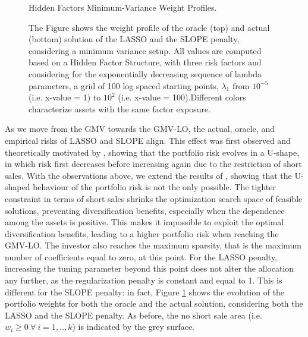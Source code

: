 \documentclass[12pt, a4paper]{article}
\begin{document}
%
\begin{figure}[h!]
\centering
\caption{Hidden Factors Minimum-Variance Weight Profiles.}\label{Weights_HiddenFactors_MinVar}
\captionsetup{font=scriptsize,labelfont=scriptsize, width=\textwidth}
     \caption*{The Figure shows the weight profile of the oracle (top) and actual (bottom) solution of the LASSO and the SLOPE penalty, considering a minimum variance setup. All values are computed based on a Hidden Factor Structure, with three risk factors and considering for the exponentially decreasing sequence of lambda parameters, a grid of 100 log spaced starting points, $\lambda_{1}$ from $10^{-5}$ (i.e. x-value = 1) to $10^{2}$ (i.e. x-value = 100).Different colors characterize assets with the same factor exposure.}
\end{figure}
%
\noindent
As we move from the GMV towards the GMV-LO, the actual, oracle, and empirical risks of LASSO and SLOPE align. This effect was first observed and theoretically motivated by \cite{Fan2012}, showing that the portfolio risk evolves in a U-shape, in which risk first decreases before increasing again due to the restriction of short sales. With the observations above, we extend the results of \cite{Fan2012}, showing that the U-shaped behaviour of the portfolio risk is not the only possible. The tighter constraint in terms of short sales shrinks the optimization search space of feasible solutions, preventing diversification benefits, especially when the dependence among the assets is positive. This makes it impossible to exploit the optimal diversification benefits, leading to a higher portfolio risk when reaching the GMV-LO. The investor also reaches the maximum sparsity, that is the maximum number of coefficients equal to zero, at this point. For the LASSO penalty, increasing the tuning parameter beyond this point does not alter the allocation any further, as the regularization penalty is constant and equal to 1. This is different for the SLOPE penalty: in fact, Figure \ref{Weights_HiddenFactors_MinVar} shows the evolution of the portfolio weights for both the oracle and the actual solution, considering both the LASSO and the SLOPE penalty. As before, the no short sale area (i.e. $w_{i} \geq 0\ \forall \ i=1,.., k$) is indicated by the grey surface.\\
\end{document}
